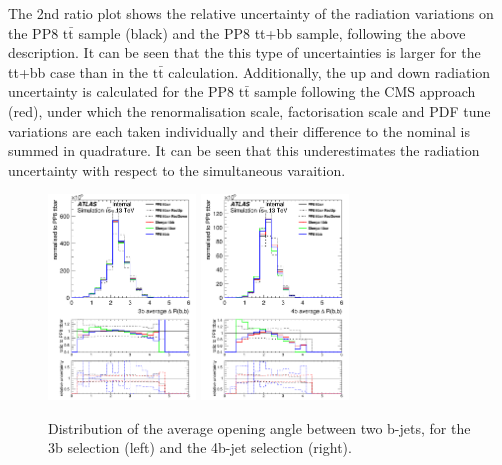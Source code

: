 The 2nd ratio plot shows the relative uncertainty of the radiation variations on the PP8 $\mathrm{t\bar{t}}$ sample (black) and the PP8 tt+bb sample, following the above description. It can be seen that the this type of uncertainties is larger for the tt+bb case than in the $\mathrm{t\bar{t}}$ calculation.
Additionally, the up and down radiation uncertainty is calculated for the PP8 $\mathrm{t\bar{t}}$ sample following the CMS approach (red), under which the renormalisation scale, factorisation scale and PDF tune variations are each taken individually and their difference to the nominal is summed in quadrature. It can be seen that this underestimates the radiation uncertainty with respect to the simultaneous varaition.


\begin{figure}[!htb]
\centering
\includegraphics[width=0.35\textwidth]{Plots/ttbb/hisgenEvt_Dr_GenBJetsAverage_4j3t__div}
\includegraphics[width=0.35\textwidth]{Plots/ttbb/hisgenEvt_Dr_GenBJetsAverage_4j4t__div}
  \caption{Distribution of the average opening angle between two b-jets, for the 3b selection (left) and the 4b-jet selection (right). \label{ttbb:avedR}}
\end{figure}

